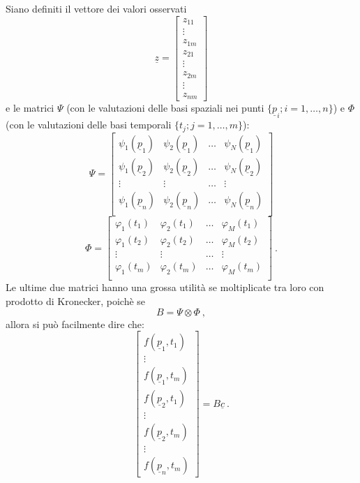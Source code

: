 \documentclass[a4paper,11pt,twoside,openright]{book}							%
\begin{document}
Siano definiti il vettore dei valori osservati
\begin{equation}
\underline z =
\begin{bmatrix}
z_{11}  \\
\vdots\\
z_{1m}  \\
z_{21}  \\
\vdots\\
z_{2m}  \\
\vdots\\
z_{nm}
\end{bmatrix}
\end{equation}
e le matrici $\Psi$ (con le valutazioni delle basi spaziali nei punti $\{\underline p_i; i = 1,\ldots,n\}$) e $\Phi$ (con le valutazioni delle basi temporali $\{t_j; j = 1,\ldots,m\}$):
$$
\Psi =
\begin{bmatrix}
\psi_{1}(\underline p_1) & \psi_{2}(\underline p_1) & \hdots & \psi_{N}(\underline p_1)  \\
\psi_{1}(\underline p_2) & \psi_{2}(\underline p_2) & \hdots & \psi_{N}(\underline p_2)  \\
\vdots & \vdots & \hdots & \vdots \\
\psi_{1}(\underline p_n) & \psi_{2}(\underline p_n) & \hdots & \psi_{N}(\underline p_n)  \\
\end{bmatrix}
$$
$$
\Phi = 
\begin{bmatrix}
\varphi_{1}( t_1) & \varphi_{2}( t_1) & \hdots & \varphi_{M}( t_1)  \\
\varphi_{1}( t_2) & \varphi_{2}( t_2) & \hdots & \varphi_{M}( t_2)  \\
\vdots & \vdots & \hdots & \vdots \\
\varphi_{1}( t_m) & \varphi_{2}( t_m) & \hdots & \varphi_{M}( t_m)  \\
\end{bmatrix} \ .
$$
Le ultime due matrici hanno una grossa utilità se moltiplicate tra loro con prodotto di Kronecker, poichè se
$$ B = \Psi \otimes \Phi \ ,$$
allora si può facilmente dire che:
$$
\begin{bmatrix}
f(\underline p_1,t_1)  \\
\vdots\\
f(\underline p_1,t_m)  \\
f(\underline p_2,t_1)  \\
\vdots\\
f(\underline p_2,t_m)  \\
\vdots\\
f(\underline p_n,t_m)
\end{bmatrix}= B \underline c \ .
$$
\end{document}
